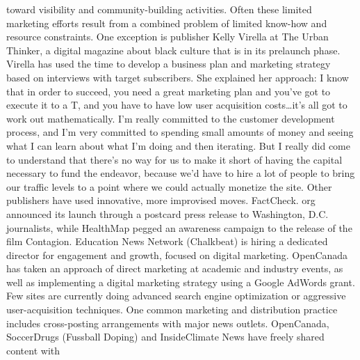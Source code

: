 toward visibility and community-building activities. Often these limited
marketing efforts result from a combined problem of limited know-how
and resource constraints.
One exception is publisher Kelly Virella at The Urban Thinker, a digital
magazine about black culture that is in its prelaunch phase. Virella has used
the time to develop a business plan and marketing strategy based on interviews
with target subscribers. She explained her approach:
I know that in order to succeed, you need a great marketing plan and
you’ve got to execute it to a T, and you have to have low user acquisition
costs…it’s all got to work out mathematically.
I’m really committed to the customer development process, and I’m
very committed to spending small amounts of money and seeing
what I can learn about what I’m doing and then iterating. But I really
did come to understand that there’s no way for us to make it short of
having the capital necessary to fund the endeavor, because we’d have
to hire a lot of people to bring our traffic levels to a point where we
could actually monetize the site.
Other publishers have used innovative, more improvised moves. FactCheck.
org announced its launch through a postcard press release to Washington,
D.C. journalists, while HealthMap pegged an awareness campaign to
the release of the film Contagion. Education News Network (Chalkbeat) is
hiring a dedicated director for engagement and growth, focused on digital
marketing. OpenCanada has taken an approach of direct marketing at academic
and industry events, as well as implementing a digital marketing strategy
using a Google AdWords grant. Few sites are currently doing advanced
search engine optimization or aggressive user-acquisition techniques.
One common marketing and distribution practice includes cross-posting
arrangements with major news outlets. OpenCanada, SoccerDrugs (Fussball
Doping) and InsideClimate News have freely shared content with


